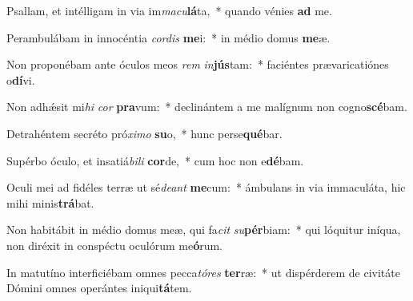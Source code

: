 \item Psallam, et intélligam in via im\textit{ma}\textit{cu}\textbf{lá}ta,~* quando vénies \textbf{ad} me.
\item Perambulábam in innocéntia \textit{cor}\textit{dis} \textbf{me}i:~* in médio domus \textbf{me}æ.
\item Non proponébam ante óculos meos \textit{rem} \textit{in}\textbf{jús}tam:~* faciéntes prævaricatiónes o\textbf{dí}vi.
\item Non adhǽsit mi\textit{hi} \textit{cor} \textbf{pra}vum:~* declinántem a me malígnum non cogno\textbf{scé}bam.
\item Detrahéntem secréto pró\textit{xi}\textit{mo} \textbf{su}o,~* hunc perse\textbf{qué}bar.
\item Supérbo óculo, et insatiá\textit{bi}\textit{li} \textbf{cor}de,~* cum hoc non e\textbf{dé}bam.
\item Oculi mei ad fidéles terræ ut sé\textit{de}\textit{ant} \textbf{me}cum:~* ámbulans in via immaculáta, hic mihi minis\textbf{trá}bat.
\item Non habitábit in médio domus meæ, qui fa\textit{cit} \textit{su}\textbf{pér}biam:~* qui lóquitur iníqua, non diréxit in conspéctu oculórum me\textbf{ó}rum.
\item In matutíno interficiébam omnes pecca\textit{tó}\textit{res} \textbf{ter}ræ:~* ut dispérderem de civitáte Dómini omnes operántes iniqui\textbf{tá}tem.
